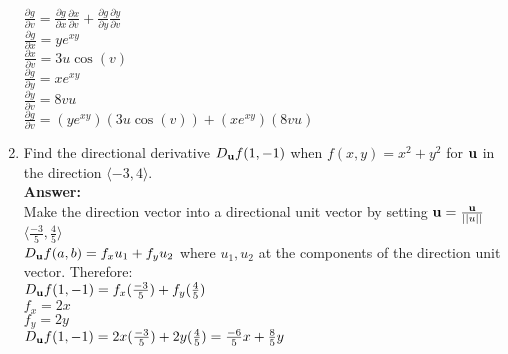 \documentclass[11pt]{article}
\begin{document}
\begin{enumerate}
    \\
    \\
    $\frac{\partial g}{\partial v}=\frac{\partial g}{\partial x}\frac{\partial x}{\partial v}+\frac{\partial g}{\partial y}\frac{\partial y}{\partial v}$
    \\
    $\frac{\partial g}{\partial x}=ye^{xy}$
    \\
    $\frac{\partial x}{\partial v}=3u \cos(v)$
    \\
    $\frac{\partial g}{\partial y}=xe^{xy}$
    \\
    $\frac{\partial y}{\partial v}=8vu$
    \\
    $\frac{\partial g}{\partial v}=(ye^{xy})(3u \cos(v))+ (xe^{xy}) (8vu) $
    
    
    
    
    \item Find the directional derivative $D_{{\bf u}}f(1, -1)$ when $f(x,y) = x^2 + y^2$ for ${\bf u}$ in the direction $\langle -3, 4 \rangle$. 
    \\
    \textbf{Answer:}
    \\
    Make the direction vector into a directional unit vector by setting ${\bf u}=\frac{\bf u}{||u||}$
    \\
    $\langle \frac{-3}{5}, \frac{4}{5} \rangle$
    \\
    
    $D_{{\bf u}}f(a, b)=f_x u_1+f_y u_2$ where $u_1,u_2$ at the components of the direction unit vector. Therefore:
    \\
    $D_{{\bf u}}f(1, -1)=f_x(\frac{-3}{5})+f_y(\frac{4}{5})$
    \\
    $f_x=2x$
    \\
    $f_y=2y$
    \\
    $D_{{\bf u}}f(1, -1)=2x(\frac{-3}{5})+2y(\frac{4}{5})=\frac{-6}{5}x+\frac{8}{5}y$
    
\end{enumerate}
\end{document}
